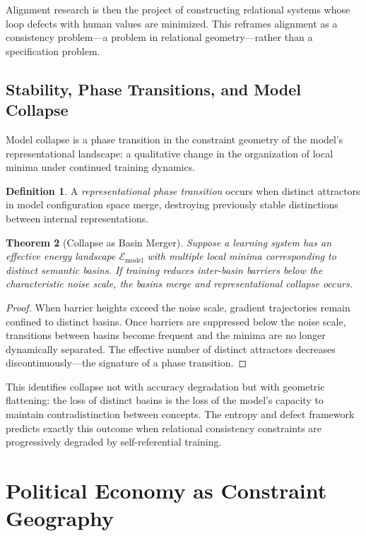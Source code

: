 \documentclass[12pt,a4paper,openany]{book}
\theoremstyle{plain}
\newtheorem{theorem}{Theorem}[chapter]
\theoremstyle{definition}
\newtheorem{definition}[theorem]{Definition}
\theoremstyle{remark}
\begin{document}
Alignment research is then the project of constructing relational systems whose loop defects with human values are minimized. This reframes alignment as a consistency problem---a problem in relational geometry---rather than a specification problem.


\section{Stability, Phase Transitions, and Model Collapse}
\label{sec:ai_phase_transitions}

Model collapse is a phase transition in the constraint geometry of the model's representational landscape: a qualitative change in the organization of local minima under continued training dynamics.

\begin{definition}
A \emph{representational phase transition} occurs when distinct attractors in model configuration space merge, destroying previously stable distinctions between internal representations.
\end{definition}

\begin{theorem}[Collapse as Basin Merger]
Suppose a learning system has an effective energy landscape $\mathcal{E}_{\mathrm{model}}$ with multiple local minima corresponding to distinct semantic basins. If training reduces inter-basin barriers below the characteristic noise scale, the basins merge and representational collapse occurs.
\end{theorem}

\begin{proof}
When barrier heights exceed the noise scale, gradient trajectories remain confined to distinct basins. Once barriers are suppressed below the noise scale, transitions between basins become frequent and the minima are no longer dynamically separated. The effective number of distinct attractors decreases discontinuously---the signature of a phase transition.
\end{proof}

This identifies collapse not with accuracy degradation but with geometric flattening: the loss of distinct basins is the loss of the model's capacity to maintain contradistinction between concepts. The entropy and defect framework predicts exactly this outcome when relational consistency constraints are progressively degraded by self-referential training.

\chapter{Political Economy as Constraint Geography}
\end{document}
